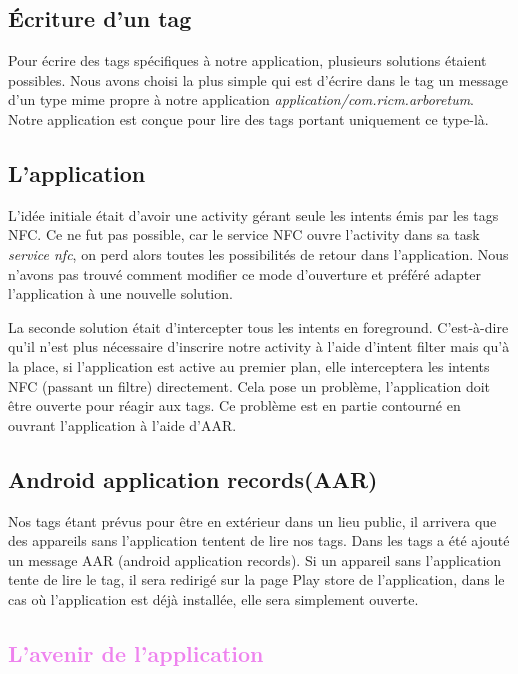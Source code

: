 \documentclass[a4paper,11pt]{article}
\begin{document}
      \textcolor{NavyBlue}{\subsection{Écriture d'un tag}}
      Pour écrire des tags spécifiques à notre application, plusieurs solutions étaient possibles.
      Nous avons choisi la plus simple qui est d’écrire dans le tag un message d’un type mime propre à notre application \textit{application/com.ricm.arboretum}. 
      Notre application est conçue pour lire des tags portant uniquement ce type-là.
      
      \textcolor{NavyBlue}{\subsection{L’application}}
      L’idée initiale était d’avoir une activity gérant seule les intents émis par les tags NFC. 
      Ce ne fut pas possible, car le service NFC ouvre l’activity dans sa task \textit{service nfc}, on perd alors toutes les possibilités de retour 
      dans l’application. 
      Nous n’avons pas trouvé comment modifier ce mode d’ouverture et préféré adapter l’application à une nouvelle solution.
      
      La seconde solution était d’intercepter tous les intents en foreground. 
      C'est-à-dire qu’il n’est plus nécessaire d’inscrire notre activity à l’aide d’intent filter mais qu’à la place, 
      si l’application est active au premier plan, elle interceptera les intents NFC (passant un filtre) directement. 
      Cela pose un problème, l’application doit être ouverte pour réagir aux tags. 
      Ce problème est en partie contourné en ouvrant l’application à l’aide d’AAR.
      
      \textcolor{NavyBlue}{\subsection{Android application records(AAR)}}
      Nos tags étant prévus pour être en extérieur dans un lieu public, il arrivera que des appareils sans l’application tentent de lire nos tags. 
      Dans les tags a été ajouté un message AAR (android application records). 
      Si un appareil sans l’application tente de lire le tag, il sera redirigé sur la page Play store de l’application, 
      dans le cas où l’application est déjà installée, elle sera simplement ouverte.
    
		\textcolor{Violet}{\section{L'avenir de l'application}}
		
\end{document}
